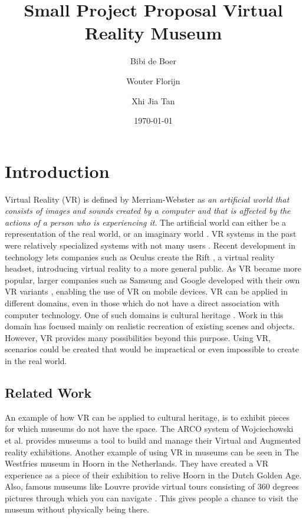 \documentclass[a4paper]{article}
\title{Small Project Proposal Virtual Reality Museum}
\author{Bibi de Boer \and Wouter Florijn \and Xhi Jia Tan}
\date{\today}
\begin{document}
\maketitle

\section{Introduction}

Virtual Reality (VR) is defined by Merriam-Webster \cite{merriam} as \emph{an artificial world that consists of images and sounds created by a computer and that is affected by the actions of a person who is experiencing it}. The artificial world can either be a representation of the real world, or an imaginary world \cite{martens}. VR systems in the past were relatively specialized systems with not many users \cite{martens}. Recent development in technology lets companies such as Oculus create the Rift \cite{oculus}, a virtual reality headset, introducing virtual reality to a more general public. As VR became more popular, larger companies such as Samsung and Google developed with their own VR variants \cite{gearvr, cardboard}, enabling the use of VR on mobile devices. VR can be applied in different domains, even in those which do not have a direct association with computer technology. One of such domains is cultural heritage \cite{wojciechowski}. Work in this domain has focused mainly on realistic recreation of existing scenes and objects. However, VR provides many possibilities beyond this purpose. Using VR, scenarios could be created that would be impractical or even impossible to create in the real world.


\subsection{Related Work}
An example of how VR can be applied to cultural heritage, is to exhibit pieces for which museums do not have the space. The ARCO system of Wojciechowski et al. \cite{wojciechowski} provides museums a tool to build and manage their Virtual and Augmented reality exhibitions. Another example of using VR in museums can be seen in The Westfries museum in Hoorn in the Netherlands. They have created a VR experience \cite{westfries} as a piece of their exhibition to relive Hoorn in the Dutch Golden Age. Also, famous museums like Louvre provide virtual tours consisting of 360 degrees pictures through which you can navigate \cite{louvre}. This gives people a chance to visit the museum without physically being there.
\end{document}
